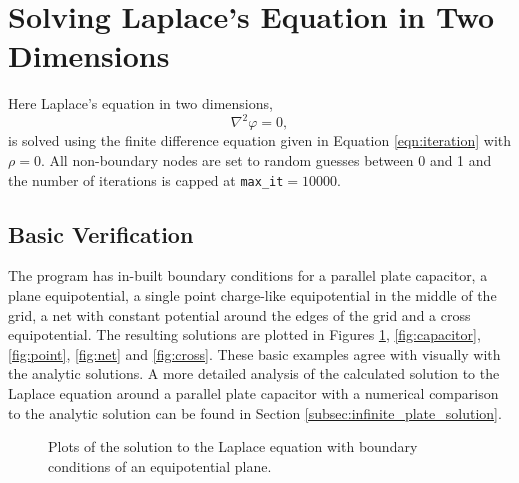 \section{Solving Laplace's Equation in Two Dimensions}
\label{sec:laplace}

Here Laplace's equation in two dimensions,
\begin{equation}
    \nabla^2 \varphi = 0,
\end{equation}
is solved using the finite difference equation given in Equation \ref{eqn:iteration} with $\rho = 0$. All non-boundary nodes are set to random guesses between 0 and 1 and the number of iterations is capped at \texttt{max\_it}$=10000$.

\subsection{Basic Verification}
\label{subsec:basic_verification}

The program has in-built boundary conditions for a parallel plate capacitor, a plane equipotential, a single point charge-like equipotential in the middle of the grid, a net with constant potential around the edges of the grid and a cross equipotential. The resulting solutions are plotted in Figures \ref{fig:plane}, \ref{fig:capacitor}, \ref{fig:point}, \ref{fig:net} and \ref{fig:cross}. These basic examples agree with visually with the analytic solutions\cite{gardner2013}. A more detailed analysis of the calculated solution to the Laplace equation around a parallel plate capacitor with a numerical comparison to the analytic solution can be found in Section \ref{subsec:infinite_plate_solution}.

\begin{figure}
    \centering
    \caption{Plots of the solution to the Laplace equation with boundary conditions of an equipotential plane.}
    \label{fig:plane}
\end{figure}

